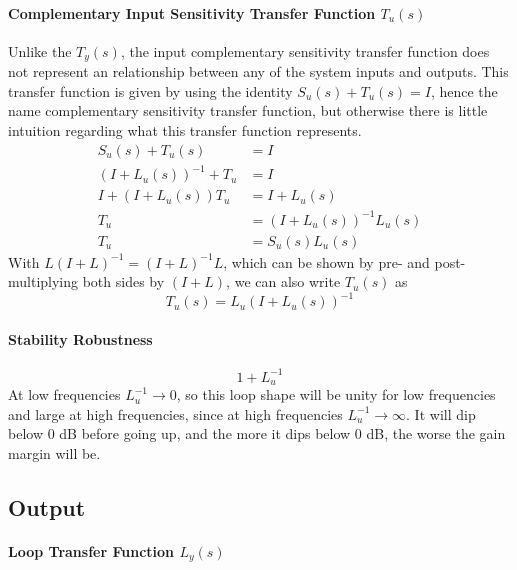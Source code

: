\paragraph{Complementary Input Sensitivity Transfer Function $T_{u}(s)$}

Unlike the $T_{y}(s)$, the input complementary sensitivity transfer function does not represent an relationship between any of the system inputs and outputs.
This transfer function is given by using the identity $S_{u}(s)+T_{u}(s)=I$, hence the name complementary sensitivity transfer function, but otherwise there is little intuition regarding what this transfer function represents.
\begin{equation*}
  \begin{split}
    S_{u}(s)+T_{u}(s)&=I \\
    (I+L_{u}(s))^{-1}+T_{u}&=I \\
    I+(I+L_{u}(s))T_{u}&=I+L_{u}(s) \\
    T_{u}&=(I+L_{u}(s))^{-1}L_{u}(s) \\
    T_{u}&=S_{u}(s)L_{u}(s)
  \end{split}
\end{equation*}
With $L(I+L)^{-1}=(I+L)^{-1}L$, which can be shown by pre- and post- multiplying both sides by $(I+L)$, we can also write $T_{u}(s)$ as
\begin{equation*}
  T_{u}(s)=L_{u}(I+L_{u}(s))^{-1}
\end{equation*}

\paragraph{Stability Robustness}

\begin{equation*}
  1+L_{u}^{-1}
\end{equation*}
At low frequencies $L_{u}^{-1}\rightarrow0$, so this loop shape will be unity for low frequencies and large at high frequencies, since at high frequencies $L_{u}^{-1}\rightarrow\infty$.
It will dip below 0 dB before going up, and the more it dips below 0 dB, the worse the gain margin will be.

\subsection{Output}

\paragraph{Loop Transfer Function $L_{y}(s)$}

